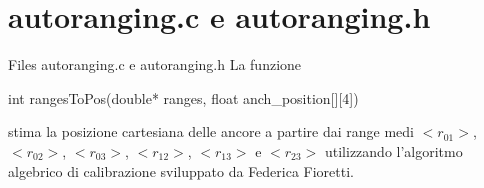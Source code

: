 \section{autoranging.c e autoranging.h}
\begin{frame}[fragile]{Files autoranging.c e autoranging.h}
  La funzione
  \begin{C}
    int rangesToPos(double* ranges, float anch_position[][4])
  \end{C}
  stima la posizione cartesiana delle ancore a partire dai range medi $<r_{01}>$,  $<r_{02}>$,  $<r_{03}>$, $<r_{12}>$, $<r_{13}>$ e $<r_{23}>$
  utilizzando l'algoritmo algebrico di calibrazione sviluppato da Federica Fioretti.
\end{frame}
